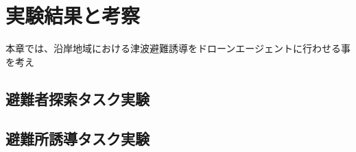 \chapter{実験結果と考察}
本章では、沿岸地域における津波避難誘導をドローンエージェントに行わせる事を考え
\section{避難者探索タスク実験}

\section{避難所誘導タスク実験}